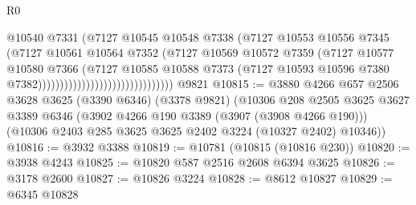 \begin{lexlean}{R0}
\begin{coremodule}
                                                    @10540
                                                    @7331
                                                    (@7127
                                                      @10545
                                                      @10548
                                                      @7338
                                                      (@7127
                                                        @10553
                                                        @10556
                                                        @7345
                                                        (@7127
                                                          @10561
                                                          @10564
                                                          @7352
                                                          (@7127
                                                            @10569
                                                            @10572
                                                            @7359
                                                            (@7127
                                                              @10577
                                                              @10580
                                                              @7366
                                                              (@7127
                                                                @10585
                                                                @10588
                                                                @7373
                                                                (@7127
                                                                  @10593
                                                                  @10596
                                                                  @7380
                                                                  @7382)))))))))))))))))))))))))))))))
    @9821
@10815 := @3880
    @4266
    @657
    @2506
    @3628
    @3625
    (@3390 @6346)
    (@3378 @9821)
    (@10306
      @208
      @2505
      @3625
      @3627
      @3389
      @6346
      (@3902 @4266 @190 @3389 (@3907 (@3908 @4266 @190)))
      (@10306 @2403 @285 @3625 @3625 @2402 @3224 (@10327 @2402) @10346))
@10816 := @3932 @3388
@10819 := @10781 (@10815 (@10816 @230))
@10820 := @3938 @4243
@10825 := @10820 @587 @2516 @2608 @6394 @3625
@10826 := @3178 @2600
@10827 := @10826 @3224
@10828 := @8612 @10827
@10829 := @6345 @10828

\end{coremodule}
\end{lexlean}
